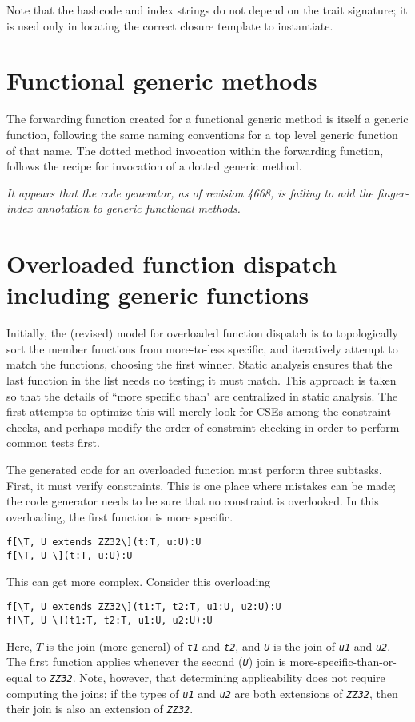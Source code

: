\documentclass[11pt]{article}
\makeatletter
\newcommand{\ftt}[1]{{\tt\slshape{#1}}}
\newcommand{\slantverbatim}{\def\verbatim@font{\slshape\ttfamily\hyphenchar\font\m@ne\@noligs}}
\makeatother
\begin{document}
Note that the hashcode and index strings do not depend on the trait signature; it is used only in locating the correct closure template to instantiate.

\section{Functional generic methods}

The forwarding function created for a functional generic method is itself a generic function, following the same naming conventions for a top level generic function of that name.  The dotted method invocation within the forwarding function, follows the recipe for invocation of a dotted generic method.

{\it It appears that the code generator, as of revision 4668, is failing to add the finger-index annotation to generic functional methods.}

\section{Overloaded function dispatch including generic functions}

Initially, the (revised) model for overloaded function dispatch is to topologically sort the member functions from more-to-less specific, and iteratively attempt to match the functions, choosing the first winner.  Static analysis ensures that the last function in the list needs no testing; it must match.  This approach is taken so that the details of ``more specific than" are centralized in static analysis.  The first attempts to optimize this will merely look for CSEs among the constraint checks, and perhaps modify the order of constraint checking in order to perform common tests first.

The generated code for an overloaded function must perform three subtasks.  First, it must verify constraints.  This is one place where mistakes can be made; the code generator needs to be sure that no constraint is overlooked.  In this overloading, the first function is more specific.  
{\slantverbatim
\begin{verbatim}
f[\T, U extends ZZ32\](t:T, u:U):U
f[\T, U \](t:T, u:U):U
\end{verbatim}
}
This can get more complex.  Consider this overloading
{\slantverbatim
\begin{verbatim}
f[\T, U extends ZZ32\](t1:T, t2:T, u1:U, u2:U):U
f[\T, U \](t1:T, t2:T, u1:U, u2:U):U
\end{verbatim}
}
Here, $T$ is the join (more general) of \ftt{t1} and \ftt{t2}, and \ftt{U} is the join of \ftt{u1} and \ftt{u2}.  The first function applies whenever the second (\ftt{U}) join is more-specific-than-or-equal to \ftt{ZZ32}.  Note, however, that determining applicability does not require computing the joins; if the types of \ftt{u1} and \ftt{u2} are both extensions of \ftt{ZZ32}, then their join is also an extension of \ftt{ZZ32}.
\end{document}
